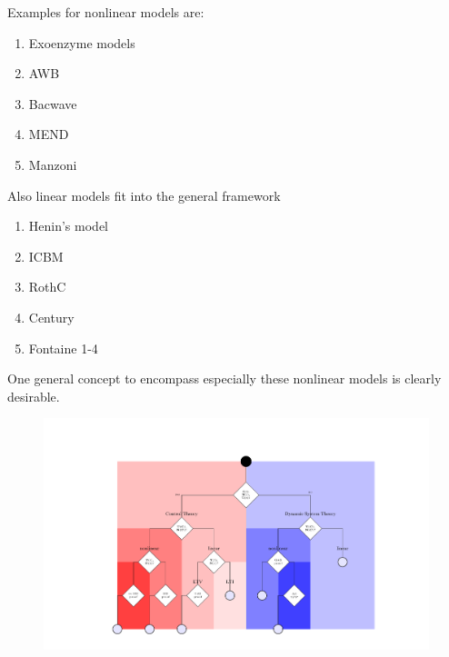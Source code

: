 \begin{minipage}[height=\columnheight]{\textwidth}
\begin{multicols*}{3}
  \begin{multicols*}{2}
		Examples for nonlinear models are:
		\begin{enumerate}
			\item Exoenzyme models \citep{Schimel,Sinsabaugh}
			\item AWB \citep{Allison}
			\item Bacwave \citep{Zelenev}
			\item MEND \citep{WangMEND}
			\item Manzoni \citep{Manzoni07}
		\end{enumerate}
    \columnbreak
		Also linear models fit into the general framework 
		\begin{enumerate}
			\item Henin's model \citep{HeninDupuis, Henin}
			\item ICBM \citep{AndrenKatterer}
			\item RothC \citep{Jenkinson, Coleman} 
			\item Century \citep{Parton} 
			\item Fontaine 1-4 \citep{Fontaine}
		\end{enumerate}
		One general concept to encompass especially  these nonlinear  models is clearly desirable.
  \end{multicols*}


  
 \begin{figure}
  \includegraphics[width=\columnwidth,clip=true,trim=4.5cm 1cm 1cm 1cm]{images/content/Fig1.pdf}
 \end{figure}


\end{multicols*}
\end{minipage}
